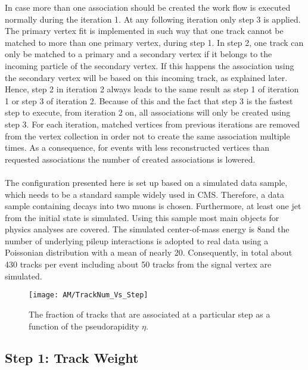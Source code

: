 In case more than one association should be created the work flow is executed normally during the iteration 1. At any following iteration only step 3 is applied. The primary vertex fit is implemented in such way that one track cannot be matched to more than one primary vertex, during step 1. In step 2, one track can only be matched to a primary and a secondary vertex if it belongs to the incoming particle of the secondary vertex. If this happens the association using the secondary vertex will be based on this incoming track, as explained later. Hence, step 2 in iteration 2 always leads to the same result as step 1 of iteration 1 or  step 3 of iteration 2. Because of this and the fact that step 3 is the fastest step to execute, from iteration 2 on, all associations will only be created using step 3. For each iteration, matched vertices from previous iterations are removed from the vertex collection in order not to create the same association multiple times. As a consequence, for events with less reconstructed vertices than requested associations the number of created associations is lowered. \\ \\
The configuration presented here is set up based on a simulated data sample, which needs to be a standard sample widely used in CMS. Therefore, a data sample containing \Zz decays into two muons is chosen. Furthermore, at least one jet from the initial state is simulated. Using this sample most main objects for physics analyses are covered. The simulated center-of-mass energy is 8\TeV and the number of underlying pileup interactions is adopted to real data using a Poissonian distribution with a mean of nearly 20. Consequently, in total about 430 tracks per event including about 50 tracks from the signal vertex are simulated.

\begin{figure}[Ht]
    \centering
    \texttt{[image: AM/TrackNum\_Vs\_Step]}
    \caption[Plot of the fraction of tracks to be associated at which step]{The fraction of tracks that are associated at a particular step as a function of the pseudorapidity $\eta{}$.\label{plot:AMTrackStepFrac}}
\end{figure}

\subsection{Step 1: Track Weight \label{sec:AMWFTW}}

